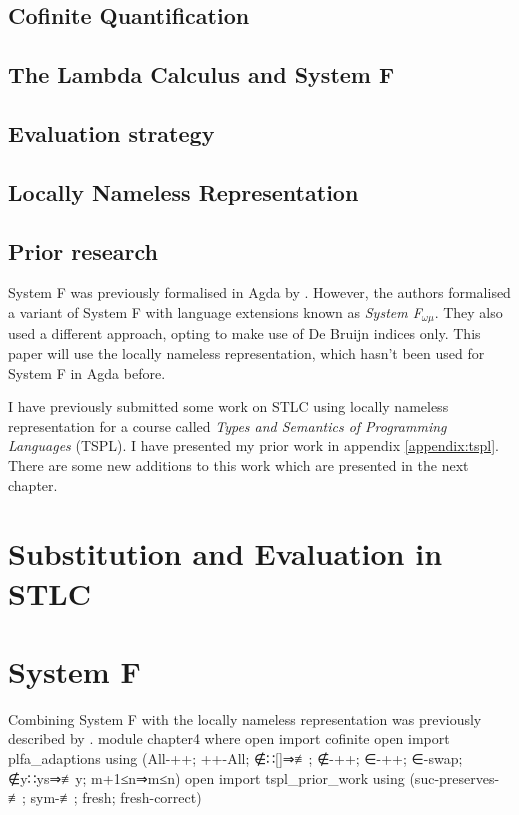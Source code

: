 \documentclass[logo,bsc,singlespacing,parskip,online]{infthesis}
\renewenvironment{code}{\mintedcopy[breaklines,breaksymbolleft=\;]{agda}}{\endmintedcopy}
\begin{document}
\section{Cofinite Quantification}



\section{The Lambda Calculus and System F}


\section{Evaluation strategy}
\label{background:evaluation_strategy}


\section{Locally Nameless Representation}


\section{Prior research}
System F was previously formalised in Agda by \citet{hutton_system_2019}. However, the authors
formalised a variant of System F with language extensions known as \textit{System F$_{\omega \mu}$}.
They also used a different approach, opting to make use of De Bruijn indices only. This paper will
use the locally nameless representation, which hasn't been used for System F in Agda before.

I have previously submitted some work on STLC using locally nameless representation for a course
called \textit{Types and Semantics of Programming Languages} (TSPL). I have presented my prior work
in appendix \ref{appendix:tspl}. There are some new additions to this work which are presented in
the next chapter.

\chapter{Substitution and Evaluation in STLC}
\label{chapter3:stlc_sub_and_eval}


\chapter{System F}
Combining System F with the locally nameless representation was previously described by
\citet{chargueraud_locally_2012}.
\begin{code}
module chapter4 where
  open import cofinite
  open import plfa_adaptions using (All-++; ++-All; ∉∷[]⇒≢; ∉-++; ∈-++; ∈-swap;
    ∉y∷ys⇒≢y; m+1≤n⇒m≤n)
  open import tspl_prior_work
    using (suc-preserves-≢; sym-≢; fresh; fresh-correct)
\end{code}
\end{document}
